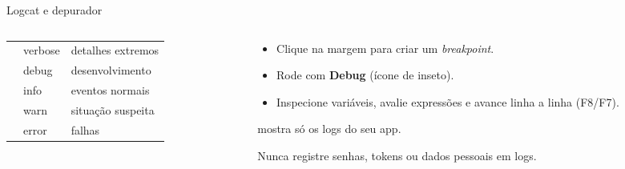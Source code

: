 \documentclass[aspectratio=169,10pt]{beamer}
\begin{document}
\begin{frame}[fragile]{Logcat e depurador}
  \begin{columns}[T]
    \begin{column}{0.5\textwidth}
      \footnotesize
      \begin{tabularx}{\linewidth}{@{}l l L@{}}
        \toprule
         & verbose & detalhes extremos \\
         & debug & desenvolvimento \\
         & info & eventos normais \\
         & warn & situação suspeita \\
         & error & falhas \\
        \bottomrule
      \end{tabularx}
    \end{column}
    \begin{column}{0.48\textwidth}
      \begin{conceito}[Depurador]
        \begin{itemize}
          \item Clique na margem para criar um \emph{breakpoint}.
          \item Rode com \textbf{Debug} (ícone de inseto).
          \item Inspecione variáveis, avalie expressões e avance linha a linha (F8/F7).
        \end{itemize}
      \end{conceito}
      \begin{dica}
         mostra só os logs do seu app.
      \end{dica}
      \begin{atencao}
        Nunca registre senhas, tokens ou dados pessoais em logs.
      \end{atencao}
    \end{column}
  \end{columns}
\end{frame}
\end{document}
